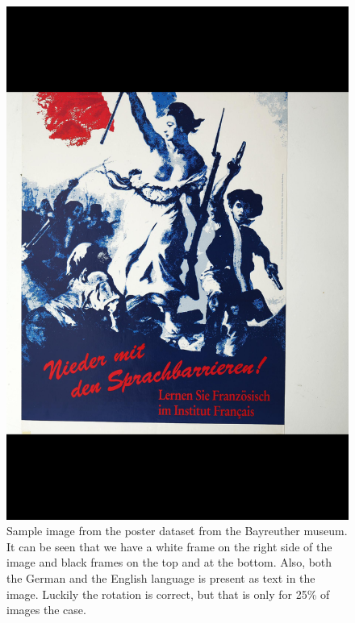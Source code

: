 \documentclass[conference]{IEEEtran}
\begin{document}
\begin{figure}
\centering
\includegraphics[width=1\linewidth]{../Imgs/acht1_042}
\caption{Sample image from the poster dataset from the Bayreuther museum. It can be seen that we have a white frame on the right side of the image and black frames on the top and at the bottom. Also, both the German and the English language is present as text in the image. Luckily the rotation is correct, but that is only for 25\% of images the case.}
\label{fig:poster}
\end{figure}
\end{document}
